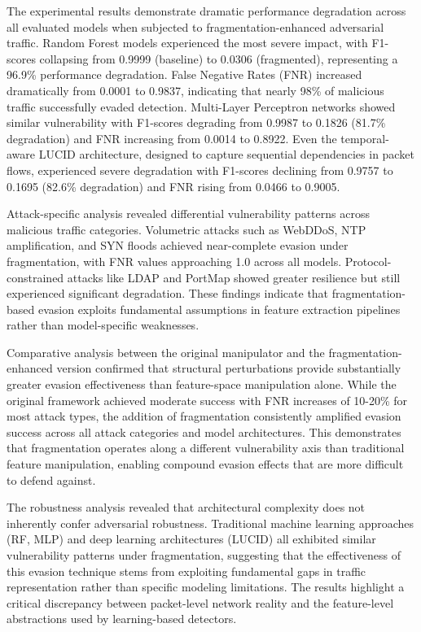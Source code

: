 The experimental results demonstrate dramatic performance degradation across all evaluated models when subjected to fragmentation-enhanced adversarial traffic. Random Forest models experienced the most severe impact, with F1-scores collapsing from 0.9999 (baseline) to 0.0306 (fragmented), representing a 96.9\% performance degradation. False Negative Rates (FNR) increased dramatically from 0.0001 to 0.9837, indicating that nearly 98\% of malicious traffic successfully evaded detection. Multi-Layer Perceptron networks showed similar vulnerability with F1-scores degrading from 0.9987 to 0.1826 (81.7\% degradation) and FNR increasing from 0.0014 to 0.8922. Even the temporal-aware LUCID architecture, designed to capture sequential dependencies in packet flows, experienced severe degradation with F1-scores declining from 0.9757 to 0.1695 (82.6\% degradation) and FNR rising from 0.0466 to 0.9005.

Attack-specific analysis revealed differential vulnerability patterns across malicious traffic categories. Volumetric attacks such as WebDDoS, NTP amplification, and SYN floods achieved near-complete evasion under fragmentation, with FNR values approaching 1.0 across all models. Protocol-constrained attacks like LDAP and PortMap showed greater resilience but still experienced significant degradation. These findings indicate that fragmentation-based evasion exploits fundamental assumptions in feature extraction pipelines rather than model-specific weaknesses.

Comparative analysis between the original manipulator and the fragmentation-enhanced version confirmed that structural perturbations provide substantially greater evasion effectiveness than feature-space manipulation alone. While the original framework achieved moderate success with FNR increases of 10-20\% for most attack types, the addition of fragmentation consistently amplified evasion success across all attack categories and model architectures. This demonstrates that fragmentation operates along a different vulnerability axis than traditional feature manipulation, enabling compound evasion effects that are more difficult to defend against.

The robustness analysis revealed that architectural complexity does not inherently confer adversarial robustness. Traditional machine learning approaches (RF, MLP) and deep learning architectures (LUCID) all exhibited similar vulnerability patterns under fragmentation, suggesting that the effectiveness of this evasion technique stems from exploiting fundamental gaps in traffic representation rather than specific modeling limitations. The results highlight a critical discrepancy between packet-level network reality and the feature-level abstractions used by learning-based detectors.

